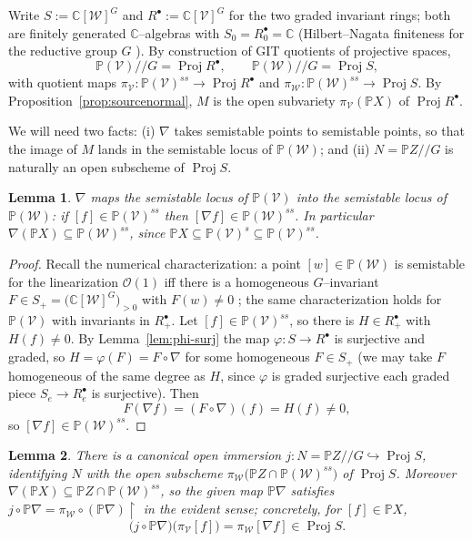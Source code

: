\documentclass{amsart}
\newtheorem{lemma}{Lemma}
\theoremstyle{definition}
\DeclareMathOperator{\Proj}{Proj}
\newcommand{\PP}{\mathbb{P}}
\newcommand{\CC}{\mathbb{C}}
\newcommand{\nab}{\nabla}
\begin{document}
Write $S:=\CC[\mathcal W]^{G}$ and $R^{\bullet}:=\CC[\mathcal V]^{G}$ for the two graded
invariant rings; both are finitely generated $\CC$--algebras with $S_0=R^{\bullet}_0=\CC$
(Hilbert--Nagata finiteness for the reductive group $G$ \cite[Ch.~1, \S 2, Thm.~1.1]{MFK}).
By construction of GIT quotients of projective spaces,
\[
\PP(\mathcal V)/\!/G=\Proj R^{\bullet},\qquad \PP(\mathcal W)/\!/G=\Proj S ,
\]
with quotient maps $\pi_{\mathcal V}\colon\PP(\mathcal V)^{ss}\to\Proj R^{\bullet}$ and
$\pi_{\mathcal W}\colon\PP(\mathcal W)^{ss}\to\Proj S$. By Proposition~\ref{prop:sourcenormal},
$M$ is the open subvariety $\pi_{\mathcal V}(\PP X)$ of $\Proj R^{\bullet}$.

We will need two facts: (i) $\nab$ takes semistable points to semistable points, so that the
image of $M$ lands in the semistable locus of $\PP(\mathcal W)$; and (ii) $N=\PP Z/\!/G$ is
naturally an open subscheme of $\Proj S$.

\begin{lemma}\label{lem:ss-to-ss}
$\nab$ maps the semistable locus of $\PP(\mathcal V)$ into the semistable locus of
$\PP(\mathcal W)$: if $[f]\in\PP(\mathcal V)^{ss}$ then $[\nab f]\in\PP(\mathcal W)^{ss}$. In
particular $\nab(\PP X)\subseteq\PP(\mathcal W)^{ss}$, since
$\PP X\subseteq\PP(\mathcal V)^{s}\subseteq\PP(\mathcal V)^{ss}$.
\end{lemma}

\begin{proof}
Recall the numerical characterization: a point $[w]\in\PP(\mathcal W)$ is semistable for the
linearization $\mathcal O(1)$ iff there is a homogeneous $G$--invariant $F\in S_{+}=
\big(\CC[\mathcal W]^{G}\big)_{>0}$ with $F(w)\neq 0$ \cite[Ch.~1, \S 4, Thm.~1.10 and
Def.~1.7]{MFK}; the same characterization holds for $\PP(\mathcal V)$ with invariants in
$R^{\bullet}_{+}$. Let $[f]\in\PP(\mathcal V)^{ss}$, so there is $H\in R^{\bullet}_{+}$ with
$H(f)\neq 0$. By Lemma~\ref{lem:phi-surj} the map $\varphi\colon S\to R^{\bullet}$ is
surjective and graded, so $H=\varphi(F)=F\circ\nab$ for some homogeneous
$F\in S_{+}$ (we may take $F$ homogeneous of the same degree as $H$, since $\varphi$ is graded
surjective each graded piece $S_e\to R^\bullet_e$ is surjective). Then
\[
F(\nab f)=(F\circ\nab)(f)=H(f)\neq 0 ,
\]
so $[\nab f]\in\PP(\mathcal W)^{ss}$.
\end{proof}

\begin{lemma}\label{lem:Nopen}
There is a canonical open immersion $j\colon N=\PP Z/\!/G\hookrightarrow \Proj S$, identifying
$N$ with the open subscheme $\pi_{\mathcal W}\big(\PP Z\cap\PP(\mathcal W)^{ss}\big)$ of
$\Proj S$. Moreover $\nab(\PP X)\subseteq \PP Z\cap\PP(\mathcal W)^{ss}$, so the given map
$\PP\nab$ satisfies $j\circ\PP\nab=\pi_{\mathcal W}\circ(\PP\nab)\!\restriction$ in the
evident sense; concretely, for $[f]\in\PP X$,
\[
\big(j\circ\PP\nab\big)\big(\pi_{\mathcal V}[f]\big)=\pi_{\mathcal W}[\nab f]\in\Proj S .
\]
\end{lemma}
\end{document}
